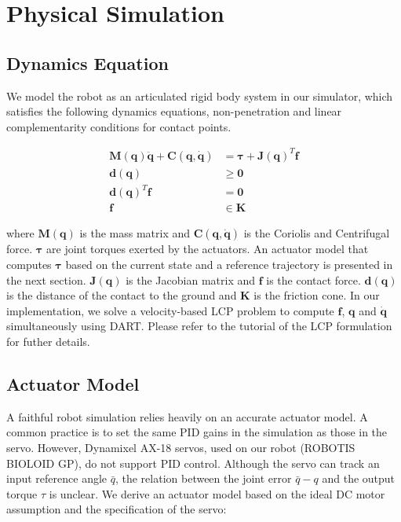 \section{Physical Simulation}

\subsection{Dynamics Equation}

We model the robot as an articulated rigid body system in our simulator, which satisfies the following dynamics equations, non-penetration and linear complementarity conditions for contact points.

\begin{align}
\label{eq:robotdynamics}
\mathbf{M}(\mathbf{q})\mathbf{\ddot{q}}+\mathbf{C}(\mathbf{q},\mathbf{\dot{q}})&=\boldsymbol{\tau}+\mathbf{J}(\mathbf{q})^T\mathbf{f}\\
\nonumber \mathbf{d}(\mathbf{q})&\geq \mathbf{0}\\
\nonumber \mathbf{d}(\mathbf{q})^T\mathbf{f}&= \mathbf{0}\\
\nonumber \mathbf{f}&\in\mathbf{K}
\nonumber \end{align}

where $\mathbf{M}(\mathbf{q})$ is the mass matrix and $\mathbf{C}(\mathbf{q},\mathbf{\dot{q}})$ is the Coriolis and Centrifugal force. $\boldsymbol{\tau}$ are joint torques exerted by the actuators. An actuator model that computes $\boldsymbol{\tau}$ based on the current state and a reference trajectory is presented in the next section. $\mathbf{J}(\mathbf{q})$ is the Jacobian matrix and $\mathbf{f}$ is the contact force. $\mathbf{d}(\mathbf{q})$ is the distance of the contact to the ground and $\mathbf{K}$ is the friction cone. In our implementation, we solve a velocity-based LCP problem to compute $\mathbf{f}$, $\mathbf{q}$ and $\dot{\mathbf{q}}$ simultaneously using DART. Please refer to the tutorial of the LCP formulation \cite{Tan:2012b} for futher details.

\subsection{Actuator Model}
\label{sec:motorDynamics}
A faithful robot simulation relies heavily on an accurate actuator model. A common practice is to set the same PID gains in the simulation as those in the servo. However, Dynamixel AX-18 servos, used on our robot (ROBOTIS BIOLOID GP), do not support PID control. Although the servo can track an input reference angle $\bar{q}$, the relation between the joint error $\bar{q}-q$ and the output torque $\tau$ is unclear. We derive an actuator model based on the ideal DC motor assumption and the specification of the servo:

